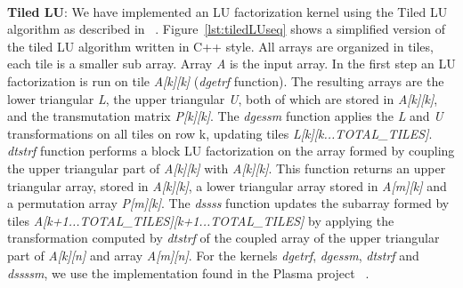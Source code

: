\paragraph{}
	\textbf{Tiled LU}: We have implemented an LU factorization kernel using the Tiled LU algorithm as described in
~\cite{Buttari:2009:CPT:1486274.1486415}.  Figure~\ref{lst:tiledLUseq} shows a simplified version of the tiled
LU algorithm written in C++ style. All arrays are organized in tiles, each tile is a smaller sub array.  Array
\emph{A} is the input array.  In the first step an LU factorization is run on tile \emph{A[k][k]} (\emph{dgetrf} 
function).  The resulting arrays are the lower triangular \emph{L}, the upper triangular \emph{U}, both of which 
are stored in \emph{A[k][k]}, and the transmutation matrix \emph{P[k][k]}.  
The \emph{dgessm} function applies the \emph{L} and 
\emph{U} transformations on all tiles on row k, updating tiles \emph{L[k][k...TOTAL\_TILES]}. \emph{dtstrf}
function performs a block LU factorization on the array formed by coupling the upper triangular part of
\emph{A[k][k]} with \emph{A[k][k]}.
This function returns an upper triangular array, stored in \emph{A[k][k]}, a lower triangular array 
stored in \emph{A[m][k]} and a permutation array \emph{P[m][k]}.  The \emph{dssss} function updates the subarray
formed by tiles \emph{A[k+1...TOTAL\_TILES][k+1...TOTAL\_TILES]} by applying the  transformation computed by \emph{dtstrf}
of the coupled array of the upper triangular part of \emph{A[k][n]} and array \emph{A[m][n]}.  For the kernels \emph{dgetrf},
\emph{dgessm}, \emph{dtstrf} and \emph{dssssm}, we use the implementation found in the Plasma project
~\cite{1742-6596-180-1-012037}.
	
